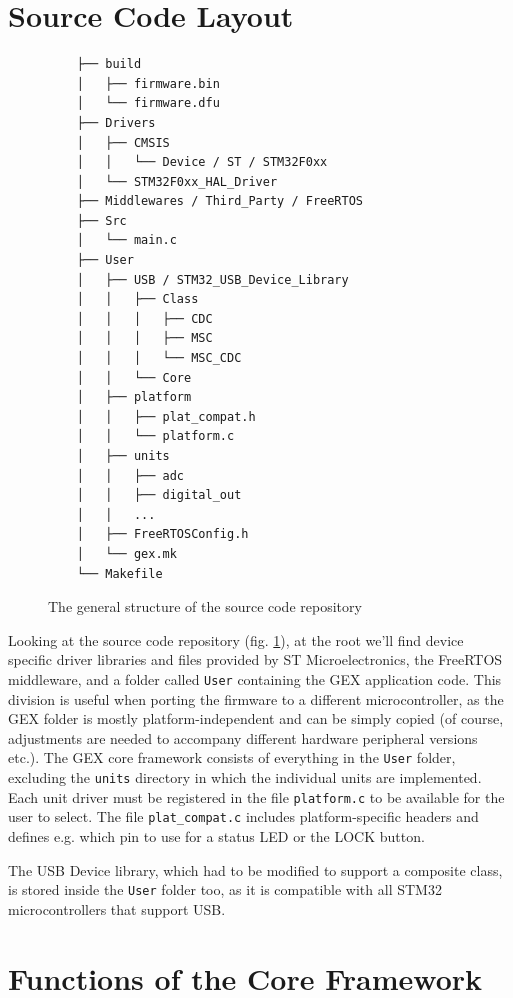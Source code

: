 \section{Source Code Layout}

\begin{figure}
	\scriptsize\vspace{-3em}
	\begin{verbatim}
	├── build
	│   ├── firmware.bin
	│   └── firmware.dfu
	├── Drivers
	│   ├── CMSIS
	│   │   └── Device / ST / STM32F0xx
	│   └── STM32F0xx_HAL_Driver
	├── Middlewares / Third_Party / FreeRTOS
	├── Src
	│   └── main.c
	├── User
	│   ├── USB / STM32_USB_Device_Library
	│   │   ├── Class
	│   │   │   ├── CDC
	│   │   │   ├── MSC
	│   │   │   └── MSC_CDC
	│   │   └── Core
	│   ├── platform
	│   │   ├── plat_compat.h
	│   │   └── platform.c
	│   ├── units
	│   │   ├── adc
	│   │   ├── digital_out
	│   │   ...
	│   ├── FreeRTOSConfig.h
	│   └── gex.mk
	└── Makefile
	\end{verbatim}
	\vspace{-1em}
	\caption{\label{fig:repo-structure} The general structure of the source code repository}
\end{figure}

Looking at the source code repository (fig. \ref{fig:repo-structure}), at the root we'll find device specific driver libraries and files provided by ST Microelectronics, the FreeRTOS middleware, and a folder called \verb|User| containing the GEX application code. This division is useful when porting the firmware to a different microcontroller, as the GEX folder is mostly platform-independent and can be simply copied (of course, adjustments are needed to accompany different hardware peripheral versions etc.). The GEX core framework consists of everything in the \verb|User| folder, excluding the \verb|units| directory in which the individual units are implemented. Each unit driver must be registered in the file \verb|platform.c| to be available for the user to select. The file \verb|plat_compat.c| includes platform-specific headers and defines e.g. which pin to use for a status \gls{LED} or the LOCK button.

The \gls{USB} Device library, which had to be modified to support a composite class, is stored inside the \verb|User| folder too, as it is compatible with all STM32 microcontrollers that support \gls{USB}.


\section{Functions of the Core Framework}

